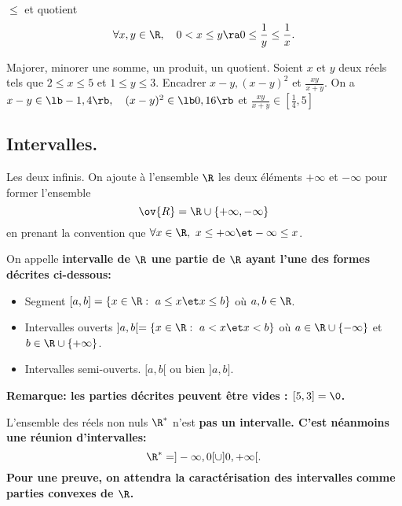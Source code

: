 \documentclass[11pt]{article}
\begin{document}
\begin{rappel}{$\leq$ et quotient}{}
    \begin{equation*}
        \forall x,y\in\R,\quad 0<x\leq y \ra 0\leq\frac{1}{y}\leq\frac{1}{x}.
    \end{equation*}
\end{rappel}

\begin{ex}{Majorer, minorer une somme, un produit, un quotient.}{}
    Soient $x$ et $y$ deux réels tels que $2\leq x\leq 5$ et $1 \leq y \leq 3$. Encadrer $x-y,(x-y)^2$ et \Large $\frac{xy}{x+y}$.
    \tcblower
    On a $x-y\in\lb-1,4\rb, \quad (x-y)^2\in\lb0,16\rb$ et \Large$\frac{xy}{x+y}$\normalsize$\in\left[\frac{1}{4},5\right]$
\end{ex}

\subsection{Intervalles.}

\begin{defi}{Les deux infinis.}{}
    On ajoute à l'ensemble $\R$ les deux éléments $+\infty$ et $-\infty$ pour former l'ensemble
    \begin{equation*}
        \ov{R}=\R\cup\{+\infty,-\infty\}
    \end{equation*}
    en prenant la convention que $\forall x\in\R,~ x\leq+\infty\et-\infty\leq x$.
\end{defi}

\begin{defi}{}{}
    On appelle \bf{intervalle} de $\R$ une partie de $\R$ ayant l'une des formes décrites ci-dessous:
    \begin{itemize}
        \item Segment $[a,b]=\{x\in\R:~a\leq x\et x\leq b\}$ où $a,b\in\R$.
        \item Intervalles ouverts $]a,b[=\{x\in\R:~a<x\et x<b\}$ où $a\in\R\cup\{-\infty\}$ et $b\in\R\cup\{+\infty\}$.
        \item Intervalles semi-ouverts. $[a,b[$ ou bien $]a,b]$.
    \end{itemize}
    \bf{Remarque:} les parties décrites peuvent être vides : $[5,3]=\0$.
\end{defi}

\begin{ex}{}{}
    L'ensemble des réels non nuls $\R^*$ n'est \bf{pas} un intervalle. C'est néanmoins une réunion d'intervalles:
    \begin{equation*}
        \R^*=]-\infty,0[\cup]0,+\infty[.
    \end{equation*}
    Pour une preuve, on attendra la caractérisation des intervalles comme parties convexes de $\R$.
\end{ex}
\end{document}
